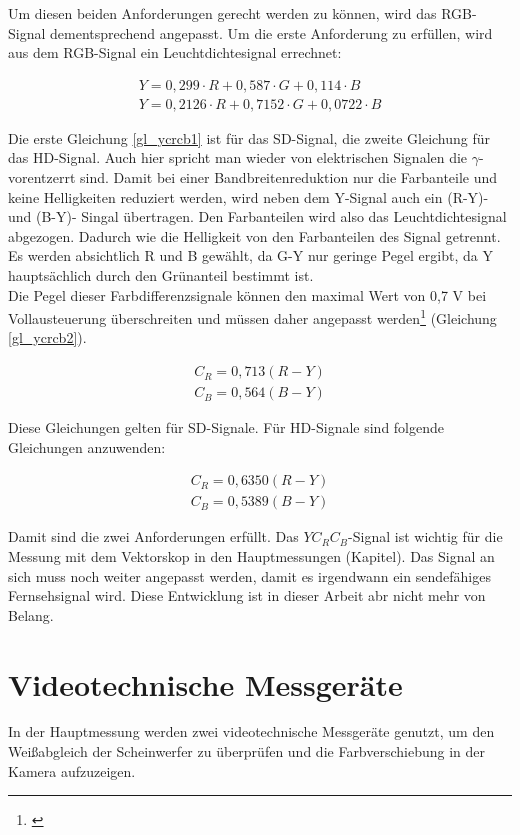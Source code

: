 Um diesen beiden Anforderungen gerecht werden zu können, wird das RGB-Signal dementsprechend angepasst. Um die erste Anforderung zu erfüllen, wird aus dem RGB-Signal ein Leuchtdichtesignal errechnet:

\begin{eqnarray}\label{gl_ycrcb1}
	Y = 0,299 \cdot R + 0,587 \cdot G + 0,114 \cdot B\\
	Y = 0,2126 \cdot R + 0,7152 \cdot G + 0,0722 \cdot B
\end{eqnarray}

Die erste Gleichung \ref{gl_ycrcb1} ist für das SD-Signal, die zweite Gleichung für das HD-Signal. Auch hier spricht man wieder von elektrischen Signalen die $\gamma$-vorentzerrt sind. Damit bei einer Bandbreitenreduktion nur die Farbanteile und keine Helligkeiten reduziert werden, wird neben dem Y-Signal auch ein (R-Y)- und (B-Y)- Singal übertragen. Den Farbanteilen wird also das Leuchtdichtesignal abgezogen. Dadurch wie die Helligkeit von den Farbanteilen des Signal getrennt. Es werden absichtlich R und B gewählt, da G-Y nur geringe Pegel ergibt, da Y hauptsächlich durch den Grünanteil bestimmt ist.\\ Die Pegel dieser Farbdifferenzsignale können den maximal Wert von 0,7 V bei Vollausteuerung überschreiten und müssen daher angepasst werden\footnote{\cite[84]{schmidt}} (Gleichung \ref{gl_ycrcb2}).

\begin{eqnarray}\label{gl_ycrcb2}
	C_{R}=0,713(R-Y)\\
	C_{B}=0,564(B-Y)
\end{eqnarray}

Diese Gleichungen gelten für SD-Signale. Für HD-Signale sind folgende Gleichungen anzuwenden:

\begin{eqnarray}\label{gl_ycrcb3}
	C_{R}=0,6350(R-Y)\\
	C_{B}=0,5389(B-Y)
\end{eqnarray}


Damit sind die zwei Anforderungen erfüllt. Das $YC_{R}C_{B}$-Signal ist wichtig für die Messung mit dem Vektorskop in den Hauptmessungen (Kapitel). Das Signal an sich muss noch weiter angepasst werden, damit es irgendwann ein sendefähiges Fernsehsignal wird. Diese Entwicklung ist in dieser Arbeit abr nicht mehr von Belang.



\chapter{Videotechnische Messgeräte}
In der Hauptmessung werden zwei videotechnische Messgeräte genutzt, um den Weißabgleich der Scheinwerfer zu überprüfen und die Farbverschiebung in der Kamera aufzuzeigen.

